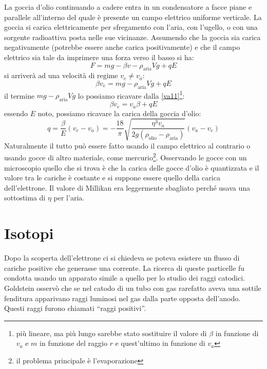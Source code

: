 La goccia d'olio continuando a cadere entra in un condensatore a facce piane e parallele all'interno del quale è presente un campo elettrico uniforme verticale. La goccia si carica elettricamente per sfregamento con l'aria, con l'ugello, o con una sorgente radioattiva posta nelle sue vicinanze. Assumendo che la goccia sia carica negativamente (potrebbe essere anche carica positivamente) e che il campo elettrico sia tale da imprimere una forza verso il basso si ha:
\begin{equation}
	F=mg-\beta v-\rho_\text{aria}Vg+qE
\end{equation}
si arriverà ad una velocità di regime $v_e\neq v_a$:
\begin{equation}
	\beta v_e=mg-\rho_\text{aria}Vg+qE
\end{equation}
il termine $mg-\rho_\text{aria}Vg$ lo possiamo ricavare dalla \eqref{va11}\footnote{più lineare, ma più lungo sarebbe stato sostituire il valore di $\beta$ in funzione di $v_a$ e $m$ in funzione del raggio $r$ e quest'ultimo in funzione di $v_a$}:
\begin{equation}
	\beta v_e=v_a\beta+qE
\end{equation}
essendo $E$ noto, possiamo ricavare la carica della goccia d'olio:
\begin{equation}
	q=\frac{\beta}{E}(v_e-v_a)=-\frac{18}{\pi}\sqrt{\frac{\eta^3v_a}{2g\left(\rho_\text{olio}-\rho_\text{aria}\right)}}\left(v_a-v_e\right)
\end{equation}
Naturalmente il tutto può essere fatto usando il campo elettrico al contrario o usando gocce di altro materiale, come mercurio\footnote{il problema principale è l'evaporazione}. Osservando le gocce con un microscopio quello che si trova è che la carica delle gocce d'olio è quantizzata e il valore tra le cariche è costante e si suppone essere quello della carica dell'elettrone. Il valore di Millikan era leggermente sbagliato perché usava una sottostima di $\eta$ per l'aria.

\section{Isotopi}
Dopo la scoperta dell'elettrone ci si chiedeva se poteva esistere un flusso di cariche positive che generasse una corrente. La ricerca di queste particelle fu condotta usando un apparato simile a quello per lo studio dei raggi catodici. Goldstein osservò che se nel catodo di un tubo con gas rarefatto aveva una sottile fenditura apparivano raggi luminosi nel gas dalla parte opposta dell'anodo. Questi raggi furono chiamati ``raggi positivi''.

